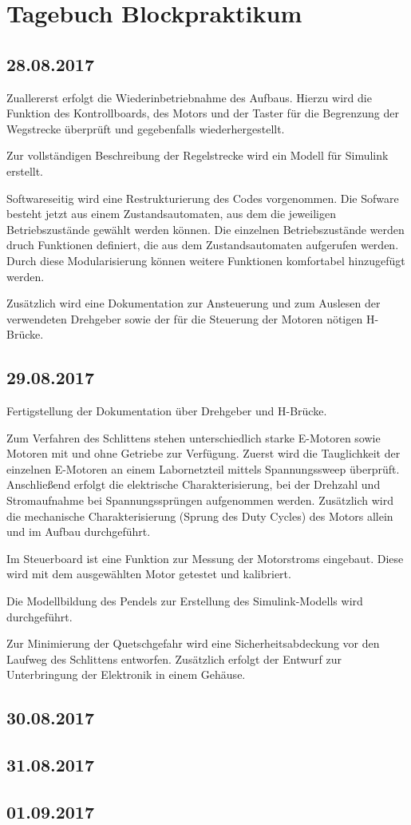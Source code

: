 \documentclass[fontsize=12pt,a4paper,parskip]{scrartcl}
\begin{document}
\let\raggedsection\centering
\section*{Tagebuch Blockpraktikum}
\let\raggedsection\raggedright

\subsection*{28.08.2017}

Zuallererst erfolgt die Wiederinbetriebnahme des Aufbaus. Hierzu wird die Funktion des Kontrollboards, des Motors und der Taster für die Begrenzung der Wegstrecke überprüft und gegebenfalls wiederhergestellt.

Zur vollständigen Beschreibung der Regelstrecke wird ein Modell für Simulink erstellt.

Softwareseitig wird eine Restrukturierung des Codes vorgenommen. Die Sofware besteht jetzt aus einem Zustandsautomaten, aus dem die jeweiligen Betriebszustände gewählt werden können. Die einzelnen Betriebszustände werden druch Funktionen definiert, die aus dem Zustandsautomaten aufgerufen werden. Durch diese Modularisierung können weitere Funktionen komfortabel hinzugefügt werden.

Zusätzlich wird eine Dokumentation zur Ansteuerung und zum Auslesen der verwendeten Drehgeber sowie der für die Steuerung der Motoren nötigen H-Brücke.


\subsection*{29.08.2017}

Fertigstellung der Dokumentation über Drehgeber und H-Brücke.

Zum Verfahren des Schlittens stehen unterschiedlich starke E-Motoren sowie Motoren mit und ohne Getriebe zur Verfügung. Zuerst wird die Tauglichkeit der einzelnen E-Motoren an einem Labornetzteil mittels Spannungssweep überprüft. Anschließend erfolgt die elektrische Charakterisierung, bei der Drehzahl und Stromaufnahme bei Spannungssprüngen aufgenommen werden. Zusätzlich wird die mechanische Charakterisierung (Sprung des Duty Cycles) des Motors allein und im Aufbau durchgeführt.

Im Steuerboard ist eine Funktion zur Messung der Motorstroms eingebaut. Diese wird mit dem ausgewählten Motor getestet und kalibriert.

Die Modellbildung des Pendels zur Erstellung des Simulink-Modells wird durchgeführt.

Zur Minimierung der Quetschgefahr wird eine Sicherheitsabdeckung vor den Laufweg des Schlittens entworfen. Zusätzlich erfolgt der Entwurf zur Unterbringung der Elektronik in einem Gehäuse.



\subsection*{30.08.2017}

\subsection*{31.08.2017}

\subsection*{01.09.2017}
\end{document}
